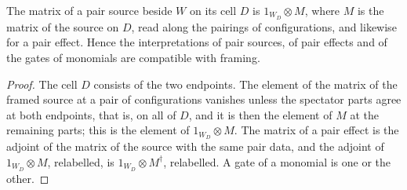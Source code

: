 \begin{theorem}
    \label{thm:party_frame_pair_compatible}
    \leanok
    The matrix of a pair source beside $W$ on its cell $D$ is $1_{W_D}\otimes M$,
    where $M$ is the matrix of the source on $D$, read along the pairings of
    configurations, and likewise for a pair effect. Hence the interpretations of
    pair sources, of pair effects and of the gates of monomials are compatible with
    framing.
\end{theorem}
\begin{proof}\leanok
    The cell $D$ consists of the two endpoints. The element of the matrix of the
    framed source at a pair of configurations vanishes unless the spectator parts
    agree at both endpoints, that is, on all of $D$, and it is then the element of
    $M$ at the remaining parts; this is the element of $1_{W_D}\otimes M$. The
    matrix of a pair effect is the adjoint of the matrix of the source with the same
    pair data, and the adjoint of $1_{W_D}\otimes M$, relabelled, is
    $1_{W_D}\otimes M^\dagger$, relabelled. A gate of a monomial is one or the
    other.
\end{proof}

